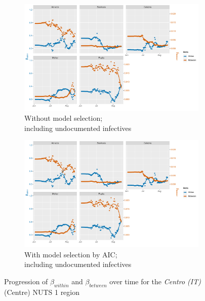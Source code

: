 \documentclass[12pt]{article}
\begin{document}
\begin{appendices}
\begin{figure}[H]
\begin{subfigure}{\textwidth}
    	      \includegraphics[width=0.95\linewidth]{output/model3_lag3_betas_Sud_UndocQuadratic_rolling.pdf}
    	      \caption{Without model selection; \\ including undocumented infectives}
    	      \label{fig:beta_within_between_over_time_sud_regular_undoc}
    	    \end{subfigure}\newline
    	    \begin{subfigure}{\textwidth}
    	      \centering
    	      \includegraphics[width=0.95\linewidth]{output/model3_lag3_betas_Sud_aic_UndocQuadratic_rolling.pdf}
    	      \caption{With model selection by AIC; \\ including undocumented infectives}
    	      \label{fig:beta_within_between_over_time_sud_aic_undoc}
    	    \end{subfigure}
    	    \caption{Progression of $\beta_{within}$ and $\beta_{between}$ over time for the \textit{Centro (IT)} (Centre) NUTS 1 region}
    	    \label{fig:beta_within_between_over_time_sud}
        \end{figure}
		

\end{appendices}
\end{document}
